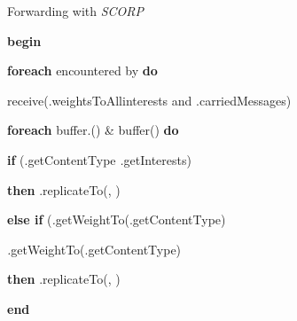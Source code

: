 \documentclass[lnicst]{svmultln}
\begin{document}
\begin{algorithm}
\caption{\label{alg:AlgorithmSCORP}Forwarding with \emph{SCORP}}


\textbf{\footnotesize begin}{\footnotesize \par}

{\footnotesize \hspace{0.1 cm}}\textbf{\footnotesize foreach}\emph{\footnotesize{}
 }{\footnotesize encountered by  }\textbf{\footnotesize do}{\footnotesize \par}

{\footnotesize \hspace{0.3 cm}receive(}\emph{\footnotesize }{\footnotesize .weightsToAllinterests
and }\emph{\footnotesize }{\footnotesize .carriedMessages)}\textbf{\footnotesize \vspace{-0.01 cm}}{\footnotesize \par}

{\footnotesize \hspace{0.3 cm}}\textbf{\footnotesize foreach}{\footnotesize{}
}\textbf{\footnotesize{} }{\footnotesize }\textbf{\footnotesize{}
}{\footnotesize buffer.() \&  buffer(}\emph{\footnotesize }{\footnotesize )
}\textbf{\footnotesize do\vspace{-0.03 cm}}{\footnotesize \par}

{\footnotesize \hspace{0.6 cm}}\textbf{\footnotesize if}{\footnotesize{}
(.getContentType }\emph{\footnotesize .}{\footnotesize getInterests)}\textbf{\footnotesize \vspace{-0.03 cm}}{\footnotesize \par}

{\footnotesize \hspace{0.9 cm}}\textbf{\footnotesize then}{\footnotesize{}
.replicateTo(}\emph{\footnotesize }{\footnotesize ,
)}\textbf{\footnotesize \vspace{-0.03 cm}}{\footnotesize \par}

{\footnotesize \hspace{0.6 cm}}\textbf{\footnotesize else if}{\footnotesize{}
(}\emph{\footnotesize .}{\footnotesize getWeightTo(.getContentType)
 }{\footnotesize \par}

{\footnotesize \hspace{2.5 cm}}\emph{\footnotesize .}{\footnotesize getWeightTo(.getContentType)}\textbf{\footnotesize \vspace{-0.03 cm}}{\footnotesize \par}

{\footnotesize \hspace{0.9 cm}}\textbf{\footnotesize then}{\footnotesize{}
.replicateTo(}\emph{\footnotesize }{\footnotesize ,
)}\textbf{\footnotesize \vspace{-0.03 cm}}{\footnotesize \par}

\textbf{\footnotesize end}
\end{algorithm}
\end{document}
